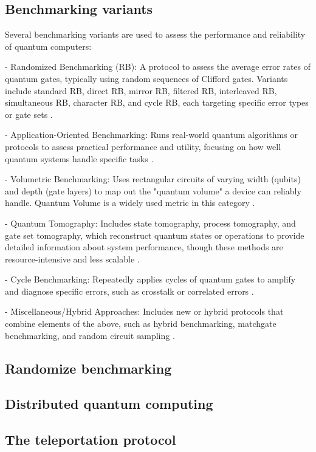 \subsection*{Benchmarking variants}

Several benchmarking variants are used to assess the performance and reliability of quantum computers:

- Randomized Benchmarking (RB): A protocol to assess the average error rates of quantum gates, typically using random sequences of Clifford gates. Variants include standard RB, direct RB, mirror RB, filtered RB, interleaved RB, simultaneous RB, character RB, and cycle RB, each targeting specific error types or gate sets \cite{knillRandomizedBenchmarkingQuantum2008_2008-[3],heinrichRandomizedBenchmarkingRandom_2023-[9],malhotraSystematicReviewQuantum_2024-[68]}.

- Application-Oriented Benchmarking: Runs real-world quantum algorithms or protocols to assess practical performance and utility, focusing on how well quantum systems handle specific tasks \cite{malhotraSystematicReviewQuantum_2024-[2]}.

- Volumetric Benchmarking: Uses rectangular circuits of varying width (qubits) and depth (gate layers) to map out the "quantum volume" a device can reliably handle. Quantum Volume is a widely used metric in this category \cite{malhotraSystematicReviewQuantum_2024-[6]}.

- Quantum Tomography: Includes state tomography, process tomography, and gate set tomography, which reconstruct quantum states or operations to provide detailed information about system performance, though these methods are resource-intensive and less scalable \cite{malhotraSystematicReviewQuantum_2024-[4]}.

- Cycle Benchmarking: Repeatedly applies cycles of quantum gates to amplify and diagnose specific errors, such as crosstalk or correlated errors \cite{malhotraSystematicReviewQuantum_2024-[5]}.

- Miscellaneous/Hybrid Approaches: Includes new or hybrid protocols that combine elements of the above, such as hybrid benchmarking, matchgate benchmarking, and random circuit sampling \cite{heinrichRandomizedBenchmarkingRandom_2023-[19]}.

\subsection*{Randomize benchmarking}

\subsection*{Distributed quantum computing}

\subsection*{The teleportation protocol}

